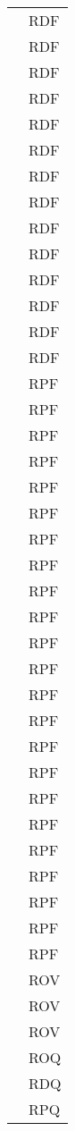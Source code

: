 \begin{longtable}{| p{5cm} | p{5cm} |}
				&	RDF \\
				&	RDF \\
				&	RDF \\
				&	RDF \\
				&	RDF \\
				&	RDF \\
				&	RDF \\
				&	RDF \\
				&	RDF \\
				&	RDF \\
				&	RDF \\
				&	RDF \\
				&	RDF \\
				&	RDF \\
				&	RPF \\
				&	RPF \\
				&	RPF \\
				&	RPF \\
				&	RPF \\
				&	RPF \\
				&	RPF \\
				&	RPF \\
				&	RPF \\
				&	RPF \\
				&	RPF \\
				&	RPF \\
				&	RPF \\
				&	RPF \\
				&	RPF \\
				&	RPF \\
				&	RPF \\
				&	RPF \\
				&	RPF \\
				&	RPF\\
				&	RPF \\
				&	RPF \\
				& 	RPF \\
				&	ROV\\
				&	ROV \\
				&	ROV \\
				&	ROQ \\
				&	RDQ \\
				&	RPQ \\
				 \hline
					

\end{longtable}

